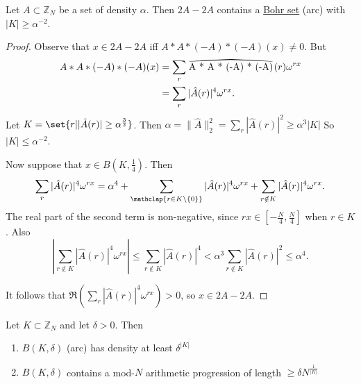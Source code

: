 \documentclass{article}
\newcommand\reallywidehat[1]{%
\savestack{\tmpbox}{\stretchto{%
  \scaleto{%
    \scalerel*[\widthof{\ensuremath{#1}}]{\kern.1pt\mathchar"0362\kern.1pt}%
    {\rule{0ex}{\textheight}}%
  }{\textheight}%
}{2.4ex}}%
\stackon[-6.9pt]{#1}{\tmpbox}%
}
\newcommand{\1}[1]{\mathbbm{1}_{#1}}
\begin{document}
\begin{nlemma}\label{lem:1.7}
  Let $A \subset \mathbb{Z}_N$ be a set of density $\alpha$. Then $2A - 2A$ contains a \hyperlink{def:bohr}{Bohr set} (arc) with $|K| \geq \alpha^{-2}$.
\end{nlemma}
\begin{proof}
  Observe that $x \in 2A - 2A$ iff $A * A * (-A) * (-A)(x) \neq 0$.
  But
  \begin{align*}
    A * A * (-A) * (-A) (x) &= \sum_r \reallywidehat{A * A * (-A) * (-A)} (r) \omega^{r x} \\
                            &= \sum_r |\hat{A}(r)|^4 \omega^{r x}.
  \end{align*}
  Let $K = \set{r | |\hat{A}(r)| \geq \alpha^\frac{3}{2}}$.
  Then $\alpha = \|\hat{A}\|^2_2 = \sum_r |\hat{A}(r)|^2 \geq \alpha^3 |K|$
  So $|K| \leq \alpha^{-2}$.

  Now suppose that $x \in B(K, \frac{1}{4})$.
  Then
  \begin{align*}
    \sum_r |\hat{A}(r)|^4 \omega^{r x} = \alpha^4 + \sum_{\mathclap{r \in K \setminus \{0\}}} |\hat{A}(r)|^4 \omega^{rx} + \sum_{r \notin K} |\hat{A}(r)|^4 \omega^{r x}.
  \end{align*}
  The real part of the second term is non-negative, since $r x \in \left[-\frac{N}{4}, \frac{N}{4}\right]$ when $r \in K$.
  Also
  \begin{equation*}
    \left|\sum_{r \notin K} |\hat{A}(r)|^4 \omega^{r x}\right| \leq \sum_{r \notin K} |\hat{A}(r)|^4 < \alpha^3 \sum_{r \notin K} |\hat{A}(r)|^2 \leq \alpha^4.
  \end{equation*}

  It follows that $\Re \left(\sum_r |\hat{A}(r)|^4 \omega^{r x}\right) > 0$, so $x \in 2A - 2A$.
\end{proof}
\begin{nlemma}\label{lem:1.8}
  Let $K \subset \mathbb{Z}_N$ and let $\delta > 0$. Then
  \begin{enumerate}[label=(\roman*)]
    \item $B(K, \delta)$ (arc) has density at least $\delta^{|K|}$
    \item $B(K, \delta)$ contains a mod-$N$ arithmetic progression of length $\geq \delta N^\frac{1}{|K|}$
  \end{enumerate}
\end{nlemma}
\end{document}

